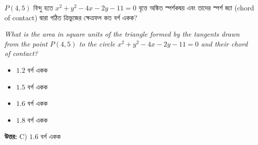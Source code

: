 \documentclass[12pt, a4paper]{article}
\begin{document}
\begin{tcolorbox}[questionbox={প্রশ্ন (Question) 1}]
    \noindent
    $P(4, 5)$ বিন্দু হতে $x^2 + y^2 - 4x - 2y - 11 = 0$ বৃত্তে অঙ্কিত স্পর্শকদ্বয় এবং তাদের স্পর্শ জ্যা (chord of contact) দ্বারা গঠিত ত্রিভুজের ক্ষেত্রফল কত বর্গ একক?
    
    \vspace{0.8em}
    \begin{english}
    \noindent\textit{\color{darkgray}
    What is the area in square units of the triangle formed by the tangents drawn from the point $P(4, 5)$ to the circle $x^2 + y^2 - 4x - 2y - 11 = 0$ and their chord of contact?
    }
    \end{english}
\end{tcolorbox}

\begin{itemize}[label={}, leftmargin=1cm, itemsep=0.5em]
    \item[\textbf{A)}] $1.2$ বর্গ একক
    \item[\textbf{B)}] $1.5$ বর্গ একক
    \item[\textbf{C)}] $1.6$ বর্গ একক
    \item[\textbf{D)}] $1.8$ বর্গ একক
\end{itemize}

\vspace{0.5em}
\begin{tcolorbox}[answerbox]
    \textbf{\color{success} উত্তর:} C) $1.6$ বর্গ একক
\end{tcolorbox}
\vspace{1em}
\end{document}
